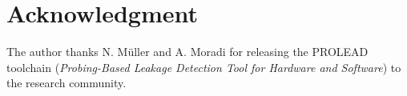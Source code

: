 \documentclass[lettersize,journal]{IEEEtran}
\begin{document}
\section*{Acknowledgment}
The author thanks N. M\"uller and A. Moradi for releasing the
PROLEAD toolchain (\textit{Probing-Based Leakage Detection Tool
for Hardware and Software}) to the research community.



\end{document}
